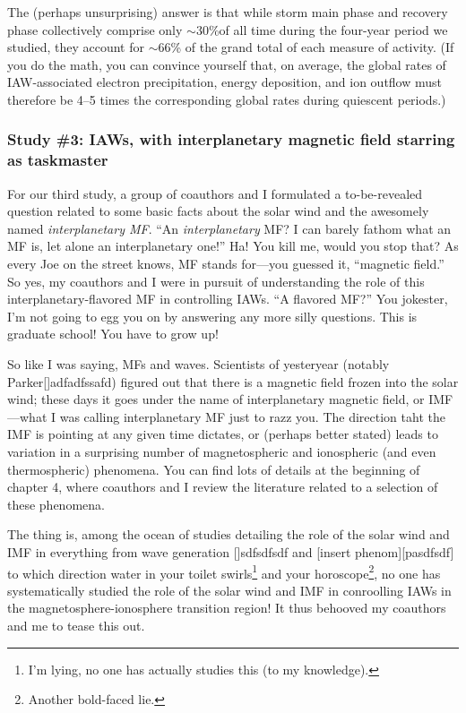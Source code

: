 The (perhaps unsurprising) answer is that while storm main phase and recovery
phase collectively comprise only $\sim$30\%of all time during the four-year
period we studied, they account for $\sim$66\% of the grand total of each
measure of \Alfic activity. (If you do the math, you can convince yourself that,
on average, the global rates of IAW-associated electron precipitation, energy
deposition, and ion outflow must therefore be 4--5 times the corresponding
global rates during quiescent periods.)

\subsubsection{Study \#3: IAWs, with interplanetary magnetic field starring as taskmaster}

For our third study, a group of coauthors and I formulated a to-be-revealed
question related to some basic facts about the solar wind and the awesomely
named \emph{interplanetary MF}. ``An \emph{interplanetary} MF? I can barely
fathom what an MF is, let alone an interplanetary one!'' Ha! You kill me, would
you stop that? As every Joe on the street knows, MF stands for---you guessed it,
``magnetic field.'' So yes, my coauthors and I were in pursuit of understanding
the role of this interplanetary-flavored MF in controlling IAWs. ``A flavored
MF?'' You jokester, I'm not going to egg you on by answering any more silly
questions. This is graduate school! You have to grow up!

So like I was saying, MFs and waves. Scientists of yesteryear (notably
Parker[]adfadfssafd) figured out that there is a magnetic field frozen into the
solar wind; these days it goes under the name of interplanetary magnetic field,
or IMF---what I was calling interplanetary MF just to razz you. The direction
taht the IMF is pointing at any given time dictates, or (perhaps better stated)
leads to variation in a surprising number of magnetospheric and ionospheric (and
even thermospheric) phenomena. You can find lots of details at the beginning of
chapter 4, where coauthors and I review the literature related to a selection of
these phenomena.

The thing is, among the ocean of studies detailing the role of the solar wind
and IMF in everything from wave generation []sdfsdfsdf and [insert
phenom][pasdfsdf] to which direction water in your toilet swirls\footnote{I'm
  lying, no one has actually studies this (to my knowledge).} and your
horoscope\footnote{Another bold-faced lie.}, no one has systematically studied
the role of the solar wind and IMF in conroolling IAWs in the
magnetosphere-ionosphere transition region! It thus behooved my coauthors and me
to tease this out.

